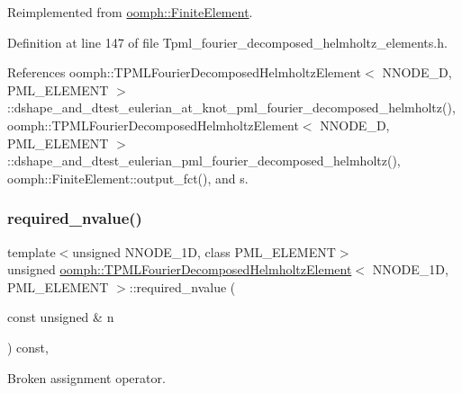 Reimplemented from \hyperlink{classoomph_1_1FiniteElement_a2a8426dccd57b927be0ae0eec00d0479}{oomph\+::\+Finite\+Element}.



Definition at line 147 of file Tpml\+\_\+fourier\+\_\+decomposed\+\_\+helmholtz\+\_\+elements.\+h.



References oomph\+::\+T\+P\+M\+L\+Fourier\+Decomposed\+Helmholtz\+Element$<$ N\+N\+O\+D\+E\+\_\+D, P\+M\+L\+\_\+\+E\+L\+E\+M\+E\+N\+T $>$\+::dshape\+\_\+and\+\_\+dtest\+\_\+eulerian\+\_\+at\+\_\+knot\+\_\+pml\+\_\+fourier\+\_\+decomposed\+\_\+helmholtz(), oomph\+::\+T\+P\+M\+L\+Fourier\+Decomposed\+Helmholtz\+Element$<$ N\+N\+O\+D\+E\+\_\+D, P\+M\+L\+\_\+\+E\+L\+E\+M\+E\+N\+T $>$\+::dshape\+\_\+and\+\_\+dtest\+\_\+eulerian\+\_\+pml\+\_\+fourier\+\_\+decomposed\+\_\+helmholtz(), oomph\+::\+Finite\+Element\+::output\+\_\+fct(), and s.

\mbox{\label{classoomph_1_1TPMLFourierDecomposedHelmholtzElement_a8515477053b4a1ade73df88030ca0aff}} 
\subsubsection{\texorpdfstring{required\+\_\+nvalue()}{required\_nvalue()}}
{\footnotesize\ttfamily template$<$unsigned N\+N\+O\+D\+E\+\_\+1D, class P\+M\+L\+\_\+\+E\+L\+E\+M\+E\+NT$>$ \\
unsigned \hyperlink{classoomph_1_1TPMLFourierDecomposedHelmholtzElement}{oomph\+::\+T\+P\+M\+L\+Fourier\+Decomposed\+Helmholtz\+Element}$<$ N\+N\+O\+D\+E\+\_\+1D, P\+M\+L\+\_\+\+E\+L\+E\+M\+E\+NT $>$\+::required\+\_\+nvalue (\begin{DoxyParamCaption}\item[{const unsigned \&}]{n }\end{DoxyParamCaption}) const\hspace{0.3cm}{\ttfamily [inline]}, {\ttfamily [virtual]}}



Broken assignment operator. 

